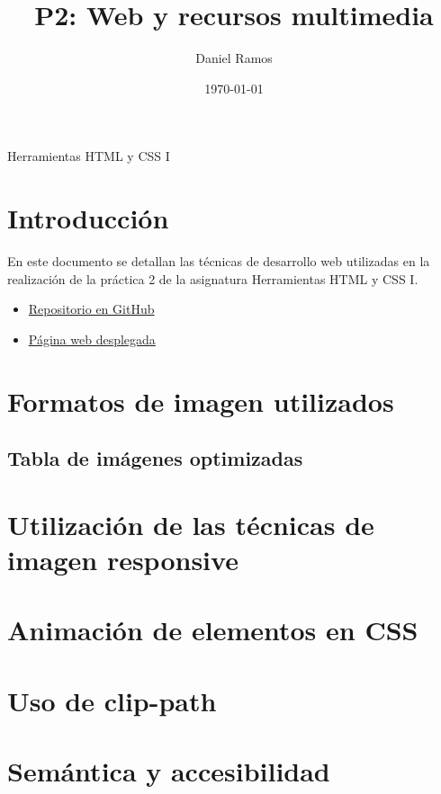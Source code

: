\documentclass{article}
\title{P2: Web y recursos multimedia}
\author{Daniel Ramos}
\date{\today}
\begin{document}
\maketitle

\begin{center}
    \large Herramientas HTML y CSS I
\end{center}

\newpage

\tableofcontents

\newpage

\section*{Introducción}

En este documento se detallan las técnicas de desarrollo web utilizadas en la realización de la práctica 2 de la asignatura Herramientas HTML y CSS I.

\begin{itemize}
    \item \href{https://github.com/DanielRamosAcosta/hhyc-dramosac}{Repositorio en GitHub}
    \item \href{https://www.danielramos.me/hhyc-dramosac}{Página web desplegada}
\end{itemize}

\newpage

\section{Formatos de imagen utilizados}\label{sec:formatos-de-imagen-utilizados}

\subsection{Tabla de imágenes optimizadas}\label{subsec:tabla-de-imagenes-optimizadas}

\section{Utilización de las técnicas de imagen responsive}\label{sec:utilizacion-de-las-tecnicas-de-imagen-responsive}

\section{Animación de elementos en CSS}\label{sec:animacion-de-elementos-en-css}

\section{Uso de clip-path}\label{sec:uso-de-clip-path}

\section{Semántica y accesibilidad}\label{sec:semantica-y-accesibilidad}
\end{document}
